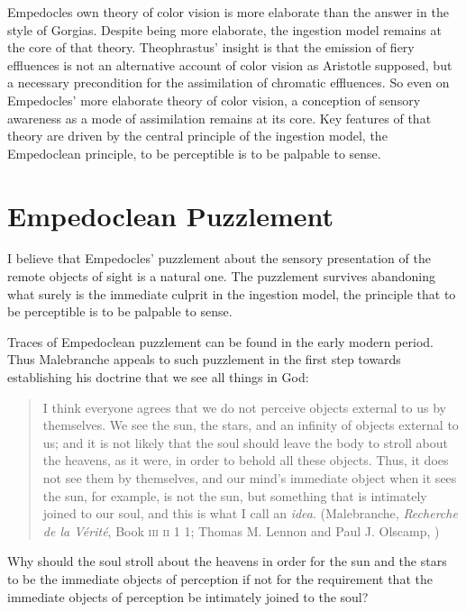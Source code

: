 Empedocles own theory of color vision is more elaborate than the answer in the style of Gorgias. Despite being more elaborate, the ingestion model remains at the core of that theory. Theophrastus' insight is that the emission of fiery effluences is not an alternative account of color vision as Aristotle supposed, but a necessary precondition for the assimilation of chromatic effluences. So even on Empedocles' more elaborate theory of color vision, a conception of sensory awareness as a mode of assimilation remains at its core. Key features of that theory are driven by the central principle of the ingestion model, the Empedoclean principle, to be perceptible is to be palpable to sense.


\section{Empedoclean Puzzlement} %
\label{sec:empedoclean_puzzlement}

I believe that Empedocles' puzzlement about the sensory presentation of the remote objects of sight is a natural one. The puzzlement survives abandoning what surely is the immediate culprit in the ingestion model, the principle that to be perceptible is to be palpable to sense.

Traces of Empedoclean puzzlement can be found in the early modern period. Thus Malebranche appeals to such puzzlement in the first step towards establishing his doctrine that we see all things in God:
\begin{quote}
	I think everyone agrees that we do not perceive objects external to us by themselves. We see the sun, the stars, and an infinity of objects external to us; and it is not likely that the soul should leave the body to stroll about the heavens, as it were, in order to behold all these objects. Thus, it does not see them by themselves, and our mind's immediate object when it sees the sun, for example, is not the sun, but something that is intimately joined to our soul, and this is what I call an \emph{idea}. (Malebranche, \emph{Recherche de la V\'{e}rit\'{e}}, Book \textsc{iii} \textsc{ii} 1 1; Thomas M. Lennon and Paul J. Olscamp, \citeyear[217]{Malebranche:1997sf})
\end{quote}
Why should the soul stroll about the heavens in order for the sun and the stars to be the immediate objects of perception if not for the requirement that the immediate objects of perception be intimately joined to the soul?

